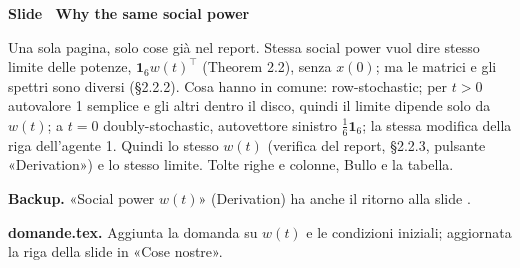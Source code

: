\par\addvspace{14pt}\noindent\begin{minipage}{\textwidth}
{\color{unipd}\bfseries Slide  \textperiodcentered\ Why the same social power}\par\smallskip
{\small Una sola pagina, solo cose già nel report. Stessa social power vuol dire stesso limite delle potenze, $\mathbf{1}_6 w(t)^\top$ (Theorem 2.2), senza $x(0)$; ma le matrici e gli spettri sono diversi (§2.2.2). Cosa hanno in comune: row-stochastic; per $t > 0$ autovalore 1 semplice e gli altri dentro il disco, quindi il limite dipende solo da $w(t)$; a $t = 0$ doubly-stochastic, autovettore sinistro $\frac16\mathbf{1}_6$; la stessa modifica della riga dell'agente 1. Quindi lo stesso $w(t)$ (verifica del report, §2.2.3, pulsante «Derivation») e lo stesso limite. Tolte righe e colonne, Bullo e la tabella.}\par\smallskip
\noindent\begin{minipage}[t]{0.36\textwidth}\par
{}\par\smallskip
{}\par\smallskip
\end{minipage}\hfill\begin{minipage}[t]{0.61\textwidth}\par
{}\par\smallskip
\end{minipage}\par
\end{minipage}\par
\par\smallskip\noindent \textbf{Backup.} «Social power $w(t)$» (Derivation) ha anche il ritorno alla slide .\par
\par\smallskip\noindent \textbf{domande.tex.} Aggiunta la domanda su $w(t)$ e le condizioni iniziali; aggiornata la riga della slide  in «Cose nostre».\par
\clearpage
